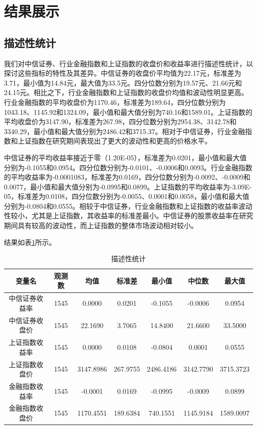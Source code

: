 \documentclass[12pt]{article}
\begin{document}
\section{结果展示}

\subsection{描述性统计}
我们对中信证券、行业金融指数和上证指数的收盘价和收益率进行描述性统计，以探讨这些指标的特性及其差异。中信证券的收盘价平均值为22.17元，标准差为3.71，最小值为14.84元，最大值为33.5元。四分位数分别为19.57元、21.66元和24.15元。相比之下，行业金融指数和上证指数的收盘价均值和波动性明显更高。行业金融指数的平均收盘价为1170.46，标准差为189.64，四分位数分别为1043.18、1145.92和1324.09，最小值和最大值分别为740.16和1589.01。上证指数的平均收盘价为3147.90，标准差为267.98，四分位数分别为2954.38、3142.78和3340.29，最小值和最大值分别为2486.42和3715.37。相对于中信证券，行业金融指数和上证指数在研究期间表现出了更大的波动性和更高的价格水平。

中信证券的平均收益率接近于零（1.20E-05），标准差为0.0201，最小值和最大值分别为-0.1055和0.0954。四分位数分别为-0.0101、-0.0006和0.0093。行业金融指数的平均收益率为-0.0001083，标准差为0.0169，四分位数分别为-0.0092、-0.0009和0.0077，最小值和最大值分别为-0.0995和0.0899。上证指数的平均收益率为-3.09E-05，标准差为0.0108，四分位数分别为-0.0055、0.0001和0.0058，最小值和最大值分别为-0.0804和0.0555。相较于中信证券，行业金融指数和上证指数的收益率波动性较小，尤其是上证指数，其收益率的标准差最小。中信证券的股票收益率在研究期间具有较高的波动性，而上证指数的整体市场波动相对较小。

结果如表\ref{tab:summary stats}所示。

\begin{table}[H]
    \centering
    \caption{描述性统计}
    \label{tab:summary stats}
    \begin{tabular}{ccccccc}
        \toprule
变量名 & 观测数 & 均值 & 标准差 & 最小值 & 中位数 & 最大值\\
        \midrule
中信证券收益率 & 1545 & 0.0000    & 0.0201   & -0.1055   & -0.0006   & 0.0954    \\
中信证券收盘价 & 1545 & 22.1690   & 3.7065   & 14.8400   & 21.6600   & 33.5000   \\
上证指数收益率 & 1545 & 0.0000    & 0.0108   & -0.0804   & 0.0001    & 0.0555    \\
上证指数收盘价 & 1545 & 3147.8986 & 267.9755 & 2486.4186 & 3142.7790 & 3715.3723 \\
金融指数收益率 & 1545 & -0.0001   & 0.0169   & -0.0995   & -0.0009   & 0.0899    \\
金融指数收盘价 & 1545 & 1170.4551 & 189.6384 & 740.1551  & 1145.9184 & 1589.0097 \\
        \bottomrule
    \end{tabular}
\end{table}
\end{document}
